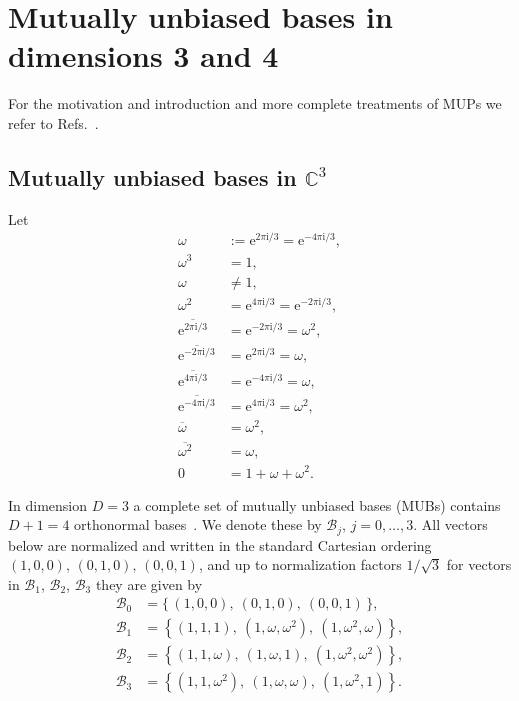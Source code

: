 \documentclass[%
  reprint,
  superscriptaddress,
  showpacs,
  showkeys,
  amsmath,amssymb,
  pra,
  longbibliography,
  floatfix,
  x11names
]{revtex4-2}
\newcommand{\ii}{\mathrm{i}}
\begin{document}



\appendix

\section{Mutually unbiased bases in dimensions 3 and 4}

For the motivation and introduction and more complete treatments of MUPs we refer to Refs.~\cite{Schwinger.60,WooFie,Brierley2009,springerlink:10.1007/978-3-540-24633-6_10,durt,mcnulty2024mutually}.

\subsection{Mutually unbiased bases in $\mathbb{C}^3$}
\label{appendix:MUBsD3}

Let
\begin{align}
\omega &:= \mathrm{e}^{2\pi \ii{}/3} = \mathrm{e}^{-4\pi \ii{}/3}, \\
\omega^{3} &= 1, \\
\omega &\neq 1,\\
\omega^{2} &= \mathrm{e}^{4\pi \ii{}/3} = \mathrm{e}^{-2\pi \ii{}/3}, \\
\overline{\mathrm{e}^{2\pi \ii{}/3}} &= \mathrm{e}^{-2\pi \ii{}/3} = \omega^{2}, \\
\overline{\mathrm{e}^{-2\pi \ii{}/3}} &= \mathrm{e}^{2\pi \ii{}/3} = \omega, \\
\overline{\mathrm{e}^{4\pi \ii{}/3}} &= \mathrm{e}^{-4\pi \ii{}/3} = \omega, \\
\overline{\mathrm{e}^{-4\pi \ii{}/3}} &= \mathrm{e}^{4\pi \ii{}/3} = \omega^{2}, \\
\overline{\omega} &= \omega^{2}, \\
\overline{\omega^{2}} &= \omega, \\
0&=1+\omega+\omega^{2}.
\end{align}

In dimension \(D=3\) a complete set of mutually unbiased bases (MUBs) contains \(D+1=4\) orthonormal bases~\cite{ivanovic-1997}.
We denote these by \(\mathcal{B}_j\), \(j=0,\dots,3\).  All vectors below are normalized and
written in the standard Cartesian ordering \((1,0,0),\,(0,1,0),\,(0,0,1)\),
and up to normalization factors ${1}/{\sqrt{3}}$ for vectors in $\mathcal{B}_1$, $\mathcal{B}_2$, $\mathcal{B}_3$ they are given by
\begin{align}
\mathcal{B}_0 &= \{\, (1,0,0),\ (0,1,0),\ (0,0,1)\,\},
\label{eq:B0_3} \\[6pt]
%
\mathcal{B}_1 &= \left\{(1,1,1),\ (1,\omega,\omega^2),\ (1,\omega^2,\omega)\right\},
\label{eq:B1_3} \\[6pt]
%
\mathcal{B}_2 &= \left\{(1,1,\omega),\ (1,\omega,1),\ (1,\omega^2,\omega^2)\right\},
\label{eq:B2_3} \\[6pt]
%
\mathcal{B}_3 &= \left\{(1,1,\omega^2),\ (1,\omega,\omega),\ (1,\omega^2,1)\right\}.
\label{eq:B3_3}
\end{align}
\end{document}

